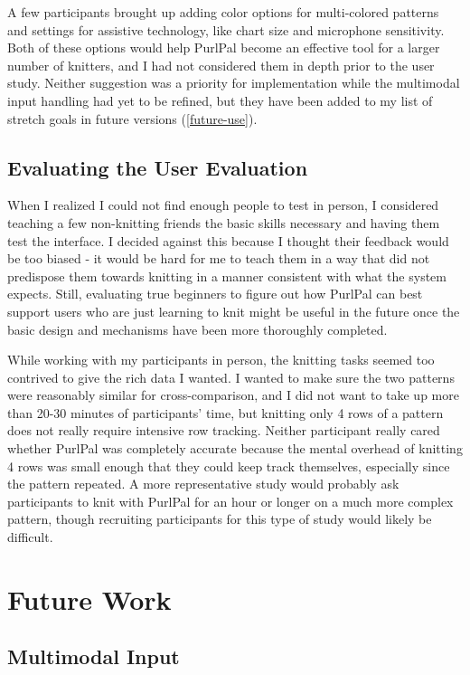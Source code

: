 \documentclass[11pt,twocolumn]{article}
\begin{document}
A few participants brought up adding color options for multi-colored patterns and settings for assistive technology, like chart size and microphone sensitivity.
Both of these options would help PurlPal become an effective tool for a larger number of knitters, and I had not considered them in depth prior to the user study.
Neither suggestion was a priority for implementation while the multimodal input handling had yet to be refined, but they have been added to my list of stretch goals in future versions (\ref{future-use}).

\subsection{Evaluating the User Evaluation} %

When I realized I could not find enough people to test in person, I considered teaching a few non-knitting friends the basic skills necessary and having them test the interface.
I decided against this because I thought their feedback would be too biased - it would be hard for me to teach them in a way that did not predispose them towards knitting in a manner consistent with what the system expects.
Still, evaluating true beginners to figure out how PurlPal can best support users who are just learning to knit might be useful in the future once the basic design and mechanisms have been more thoroughly completed.

While working with my participants in person, the knitting tasks seemed too contrived to give the rich data I wanted.
I wanted to make sure the two patterns were reasonably similar for cross-comparison, and I did not want to take up more than 20-30 minutes of participants' time, but knitting only 4 rows of a pattern does not really require intensive row tracking.
Neither participant really cared whether PurlPal was completely accurate because the mental overhead of knitting 4 rows was small enough that they could keep track themselves, especially since the pattern repeated.
A more representative study would probably ask participants to knit with PurlPal for an hour or longer on a much more complex pattern, though recruiting participants for this type of study would likely be difficult.

\section{Future Work} \label{future}

\subsection{Multimodal Input} \label{futureInput}
\end{document}
